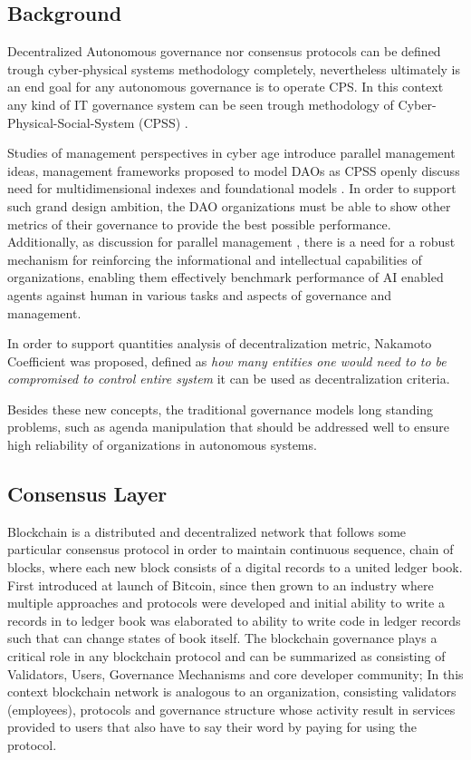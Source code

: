 \documentclass{article}
\begin{document}
\begin{CJK}{UTF8}{gbsn}
\begin{multicols}{2}
        \section{Background}
        Decentralized Autonomous governance nor consensus protocols can be defined trough cyber-physical systems \cite{Lee2008} methodology completely, nevertheless ultimately is an end goal for any autonomous governance is to operate CPS. In this context any kind of IT governance system can be seen trough methodology of Cyber-Physical-Social-System (CPSS) \cite{Fei2016}.


        Studies of management perspectives in cyber age introduce parallel management \cite{Wang2022} ideas, management frameworks proposed to model DAOs as CPSS openly discuss need for multidimensional indexes and foundational models \cite{Juanjuan2023}. In order to support such grand design ambition, the DAO organizations must be able to show other metrics of their governance to provide the best possible performance. Additionally, as discussion for parallel management \cite{Wang2022}, there is a need for a robust mechanism for reinforcing the informational and intellectual capabilities of organizations, enabling them effectively benchmark performance of AI enabled agents against human in various tasks and aspects of governance and management.

        In order to support quantities analysis of decentralization metric, Nakamoto Coefficient\cite{Balaji2017} was proposed, defined as \textit{how many entities one would need to to be compromised to control entire system} it can be used as decentralization criteria.

        Besides these new concepts, the traditional governance models long standing problems, such as agenda manipulation \cite{McKelvey1976} that should be addressed well to ensure high reliability of organizations in autonomous systems.


        \subsection{Consensus Layer}
        Blockchain is a distributed and decentralized network that follows some particular consensus protocol in order to maintain continuous sequence, chain of blocks\cite{Merlinda2019}, where each new block consists of a digital records to a united ledger book. First introduced at launch of Bitcoin\cite{Satoshi}, since then grown to an industry where multiple approaches and protocols were developed and initial ability to write a records in to ledger book was elaborated to ability to write code in ledger records such that can change states of book itself.
        The blockchain governance plays a critical role in any blockchain protocol and can be summarized as consisting of Validators, Users, Governance Mechanisms and core developer community; In this context blockchain network is analogous to an organization, consisting validators (employees), protocols and governance structure whose activity result in services provided to users that also have to say their word by paying for using the protocol.


\end{multicols}
\end{CJK}
\end{document}
